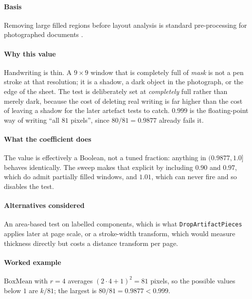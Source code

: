 \paragraph{Basis}

Removing large filled regions before layout analysis is standard pre-processing for photographed documents \cite{shafait2008}.

\paragraph{Why this value}

Handwriting is thin. A $9\times9$ window that is completely full of \emph{mask} is not a pen stroke at that resolution; it is a shadow, a dark object in the photograph, or the edge of the sheet. The test is deliberately set at \emph{completely} full rather than merely dark, because the cost of deleting real writing is far higher than the cost of leaving a shadow for the later artefact tests to catch. $0.999$ is the floating-point way of writing \enquote{all $81$ pixels}, since $80/81 = 0.9877$ already fails it.

\paragraph{What the coefficient does}

The value is effectively a Boolean, not a tuned fraction: anything in $(0.9877,1.0]$ behaves identically. The sweep makes that explicit by including $0.90$ and $0.97$, which do admit partially filled windows, and $1.01$, which can never fire and so disables the test.

\paragraph{Alternatives considered}

An area-based test on labelled components, which is what \texttt{DropArtifactPieces} applies later at page scale, or a stroke-width transform, which would measure thickness directly but costs a distance transform per page.

\paragraph{Worked example}

$\mathrm{BoxMean}$ with $r=4$ averages $(2\cdot4+1)^2 = 81$ pixels, so the possible values below $1$ are $k/81$; the largest is $80/81 = 0.9877 < 0.999$.

